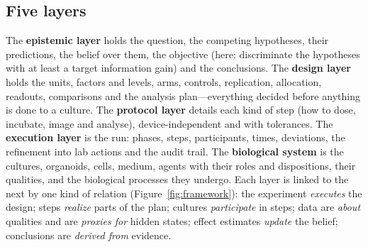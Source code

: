 \documentclass[10pt,a4paper]{article}
\begin{document}
\subsection{Five layers}
The \textbf{epistemic layer} holds the question, the competing hypotheses, their predictions, the belief over them,
the objective (here: discriminate the hypotheses with at least a target information gain) and the conclusions. The
\textbf{design layer} holds the units, factors and levels, arms, controls, replication, allocation, readouts,
comparisons and the analysis plan---everything decided before anything is done to a culture. The \textbf{protocol
layer} details each kind of step (how to dose, incubate, image and analyse), device-independent and with tolerances.
The \textbf{execution layer} is the run: phases, steps, participants, times, deviations, the refinement into lab
actions and the audit trail. The \textbf{biological system} is the cultures, organoids, cells, medium, agents with
their roles and dispositions, their qualities, and the biological processes they undergo. Each layer is linked to the
next by one kind of relation (Figure~\ref{fig:framework}): the experiment \emph{executes} the design; steps
\emph{realize} parts of the plan; cultures \emph{participate} in steps; data are \emph{about} qualities and are
\emph{proxies for} hidden states; effect estimates \emph{update} the belief; conclusions are \emph{derived from}
evidence.
\end{document}
